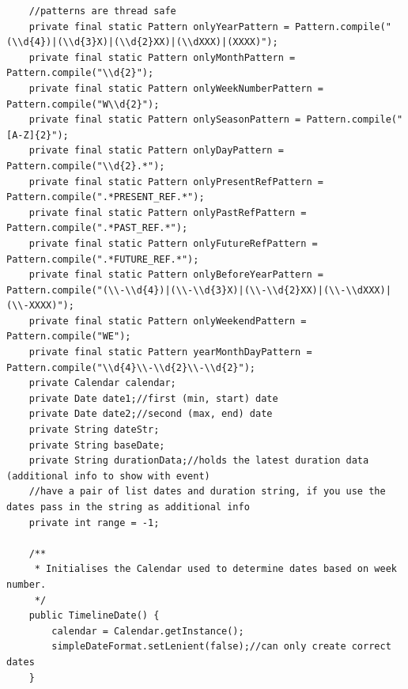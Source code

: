 \begin{lstlisting}
    //patterns are thread safe
    private final static Pattern onlyYearPattern = Pattern.compile("(\\d{4})|(\\d{3}X)|(\\d{2}XX)|(\\dXXX)|(XXXX)");
    private final static Pattern onlyMonthPattern = Pattern.compile("\\d{2}");
    private final static Pattern onlyWeekNumberPattern = Pattern.compile("W\\d{2}");
    private final static Pattern onlySeasonPattern = Pattern.compile("[A-Z]{2}");
    private final static Pattern onlyDayPattern = Pattern.compile("\\d{2}.*");
    private final static Pattern onlyPresentRefPattern = Pattern.compile(".*PRESENT_REF.*");
    private final static Pattern onlyPastRefPattern = Pattern.compile(".*PAST_REF.*");
    private final static Pattern onlyFutureRefPattern = Pattern.compile(".*FUTURE_REF.*");
    private final static Pattern onlyBeforeYearPattern = Pattern.compile("(\\-\\d{4})|(\\-\\d{3}X)|(\\-\\d{2}XX)|(\\-\\dXXX)|(\\-XXXX)");
    private final static Pattern onlyWeekendPattern = Pattern.compile("WE");
    private final static Pattern yearMonthDayPattern = Pattern.compile("\\d{4}\\-\\d{2}\\-\\d{2}");
    private Calendar calendar;
    private Date date1;//first (min, start) date
    private Date date2;//second (max, end) date
    private String dateStr;
    private String baseDate;
    private String durationData;//holds the latest duration data (additional info to show with event)
    //have a pair of list dates and duration string, if you use the dates pass in the string as additional info
    private int range = -1;

    /**
     * Initialises the Calendar used to determine dates based on week number.
     */
    public TimelineDate() {
        calendar = Calendar.getInstance();
        simpleDateFormat.setLenient(false);//can only create correct dates
    }


\end{lstlisting}
